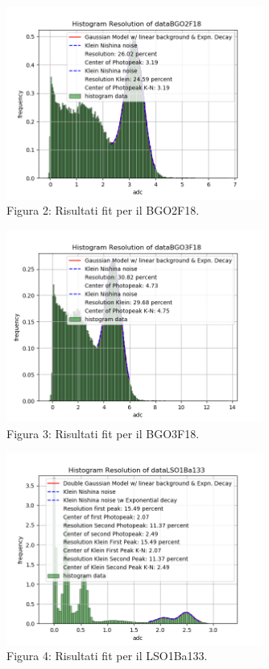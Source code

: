\documentclass[a4paper]{article}
\begin{document}
\begin{figure}[H]
\centering
\includegraphics[width=0.75\textwidth]{histkleindataBGO2F18}
\caption{Figura 2: Risultati fit per il BGO2F18.}
\end{figure}
\begin{figure}[H]
\centering
\includegraphics[width=0.75\textwidth]{histkleindataBGO3F18}
\caption{Figura 3: Risultati fit per il BGO3F18.}
\end{figure}
\begin{figure}[H]
\centering
\includegraphics[width=0.75\textwidth]{histkleindataLSO1Ba133}
\caption{Figura 4: Risultati fit per il LSO1Ba133.}
\end{figure}
\end{document}
